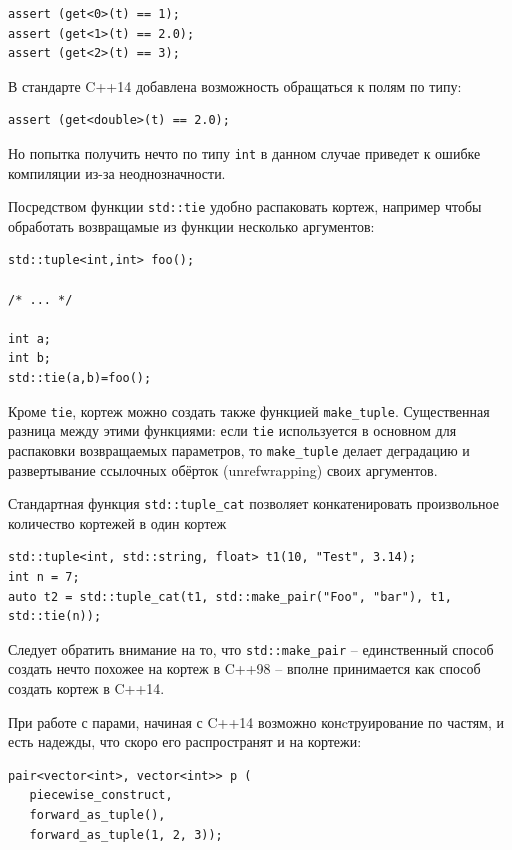 \documentclass[a4paper,12pt,oneside]{article}
\begin{document}
\begin{lstlisting}
assert (get<0>(t) == 1);
assert (get<1>(t) == 2.0);
assert (get<2>(t) == 3);
\end{lstlisting}

В стандарте C++14 добавлена возможность обращаться к полям по типу:

\begin{lstlisting}
assert (get<double>(t) == 2.0);
\end{lstlisting}

Но попытка получить нечто по типу \lstinline!int! в данном случае приведет к ошибке компиляции из-за неоднозначности.

Посредством функции \lstinline!std::tie! удобно распаковать кортеж, например чтобы обработать возвращамые из функции несколько аргументов:

\begin{lstlisting}
std::tuple<int,int> foo();

/* ... */

int a;
int b;
std::tie(a,b)=foo();
\end{lstlisting}

Кроме \lstinline!tie!, кортеж можно создать также функцией \lstinline!make_tuple!. Существенная разница между этими функциями: если \lstinline!tie! используется в основном для распаковки возвращаемых параметров, то \lstinline!make_tuple! делает деградацию и развертывание ссылочных обёрток (unrefwrapping) своих аргументов.

Стандартная функция \lstinline!std::tuple_cat! позволяет конкатенировать произвольное количество кортежей в один кортеж

\begin{lstlisting}
std::tuple<int, std::string, float> t1(10, "Test", 3.14);
int n = 7;
auto t2 = std::tuple_cat(t1, std::make_pair("Foo", "bar"), t1, std::tie(n));
\end{lstlisting}

Следует обратить внимание на то, что \lstinline!std::make_pair! -- единственный способ создать нечто похожее на кортеж в C++98 -- вполне принимается как способ создать кортеж в C++14.

При работе с парами, начиная с C++14 возможно конcтруирование по частям, и есть надежды, что скоро его распространят и на кортежи:

\begin{lstlisting}
pair<vector<int>, vector<int>> p (
   piecewise_construct,
   forward_as_tuple(),
   forward_as_tuple(1, 2, 3));
\end{lstlisting}
\end{document}
